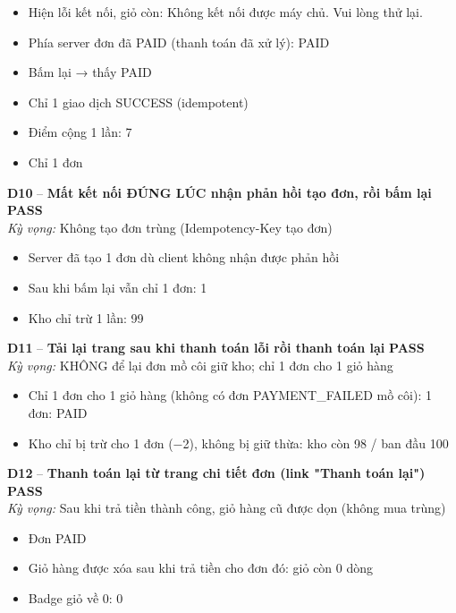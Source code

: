 \documentclass[a4paper,11pt]{article}
\newcommand{\ok}{\textcolor{okgreen}{\textbf{PASS}}}
\begin{document}
\begin{itemize}\footnotesize
\item \tick Hiện lỗi kết nối, giỏ còn: Không kết nối được máy chủ. Vui lòng thử lại.
\item \tick Phía server đơn đã PAID (thanh toán đã xử lý): PAID
\item \tick Bấm lại → thấy PAID
\item \tick Chỉ 1 giao dịch SUCCESS (idempotent)
\item \tick Điểm cộng 1 lần: 7
\item \tick Chỉ 1 đơn
\end{itemize}
\begin{minipage}{\textwidth}\vspace{4pt}\textbf{\textcolor{brew}{D10}} -- \textbf{Mất kết nối ĐÚNG LÚC nhận phản hồi tạo đơn, rồi bấm lại} \hfill \ok\\
{\small\emph{Kỳ vọng:} Không tạo đơn trùng (Idempotency-Key tạo đơn)}
\end{minipage}
\begin{itemize}\footnotesize
\item \tick Server đã tạo 1 đơn dù client không nhận được phản hồi
\item \tick Sau khi bấm lại vẫn chỉ 1 đơn: 1
\item \tick Kho chỉ trừ 1 lần: 99
\end{itemize}
\begin{minipage}{\textwidth}\vspace{4pt}\textbf{\textcolor{brew}{D11}} -- \textbf{Tải lại trang sau khi thanh toán lỗi rồi thanh toán lại} \hfill \ok\\
{\small\emph{Kỳ vọng:} KHÔNG để lại đơn mồ côi giữ kho; chỉ 1 đơn cho 1 giỏ hàng}
\end{minipage}
\begin{itemize}\footnotesize
\item \tick Chỉ 1 đơn cho 1 giỏ hàng (không có đơn PAYMENT\_FAILED mồ côi): 1 đơn: PAID
\item \tick Kho chỉ bị trừ cho 1 đơn (−2), không bị giữ thừa: kho còn 98 / ban đầu 100
\end{itemize}
\begin{minipage}{\textwidth}\vspace{4pt}\textbf{\textcolor{brew}{D12}} -- \textbf{Thanh toán lại từ trang chi tiết đơn (link "Thanh toán lại")} \hfill \ok\\
{\small\emph{Kỳ vọng:} Sau khi trả tiền thành công, giỏ hàng cũ được dọn (không mua trùng)}
\end{minipage}
\begin{itemize}\footnotesize
\item \tick Đơn PAID
\item \tick Giỏ hàng được xóa sau khi trả tiền cho đơn đó: giỏ còn 0 dòng
\item \tick Badge giỏ về 0: 0
\end{itemize}
\end{document}

